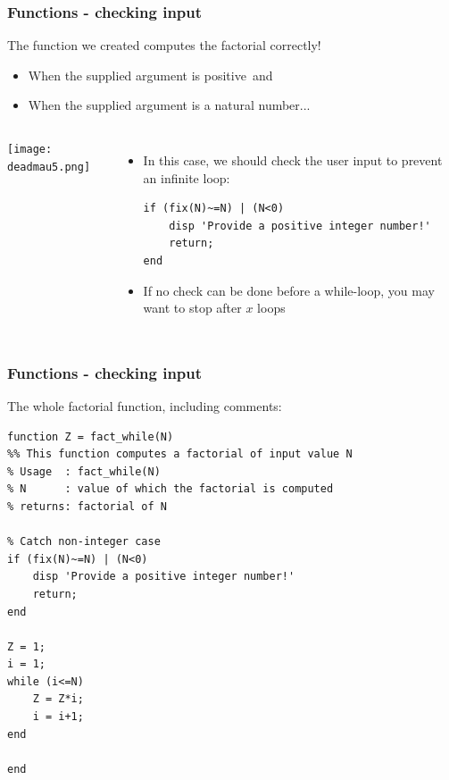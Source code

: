 \documentclass[11pt,table,final,fleqn,xcolor={usenames,dvipsnames},unknownkeysallowed,handout]{beamer}
\begin{document}
\begin{frame}[fragile]
 \frametitle{Functions - checking input}
  The function we created computes the factorial correctly! \pause
  \begin{itemize}
     \item When the supplied argument is positive\pause\ and \pause
     \item When the supplied argument is a natural number...
  \end{itemize}\pause
  \begin{columns}[T]
     \texttt{[image: deadmau5.png]}
    \pause
    \begin{itemize}[<+->]
     \item In this case, we should check the user input to prevent an infinite loop: \pause
     \begin{lstlisting}
if (fix(N)~=N) | (N<0)
    disp 'Provide a positive integer number!'
    return;
end \end{lstlisting}
      \item If no check can be done before a while-loop, you may want to stop after $x$ loops
    \end{itemize}
  \end{columns}
\end{frame}

\begin{frame}[fragile]
 \frametitle{Functions - checking input}
  The whole factorial function, including comments:
     \begin{lstlisting}
function Z = fact_while(N)
%% This function computes a factorial of input value N
% Usage  : fact_while(N)
% N      : value of which the factorial is computed
% returns: factorial of N

% Catch non-integer case
if (fix(N)~=N) | (N<0)
    disp 'Provide a positive integer number!'
    return;
end

Z = 1;
i = 1;
while (i<=N)
    Z = Z*i;
    i = i+1;
end

end \end{lstlisting}
\end{frame}
\end{document}
